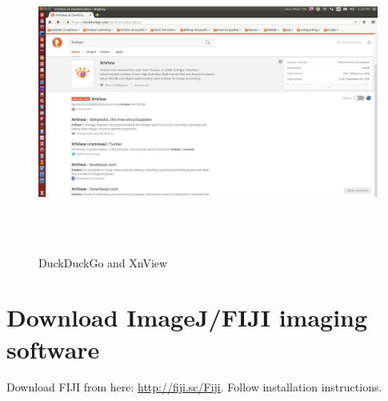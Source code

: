 \documentclass[letterpaper]{article}
\begin{document}
\begin{figure}
\centering
\includegraphics[width=175.9mm,height=98.94mm]{../e-tws/ddg} \caption{DuckDuckGo and XnView}\label{fig:1}
\end{figure}

\section{Download ImageJ/FIJI imaging software}
Download FIJI from here: \url{http://fiji.sc/Fiji}. Follow installation instructions.
\end{document}
